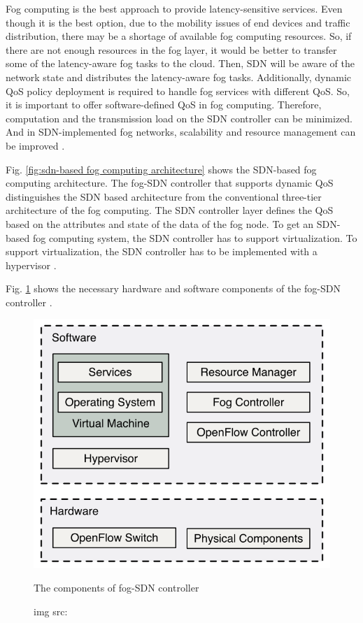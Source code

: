 Fog computing is the best approach to provide latency-sensitive services. Even though it is the best option, due to the mobility issues of end devices and traffic distribution, there may be a shortage of available fog computing resources. So, if there are not enough resources in the fog layer, it would be better to transfer some of the latency-aware fog tasks to the cloud. Then, SDN will be aware of the network state and distributes the latency-aware fog tasks. Additionally, dynamic QoS policy deployment is required to handle fog services with different QoS. So, it is important to offer software-defined QoS in fog computing. Therefore, computation and the transmission load on the SDN controller can be minimized. And in SDN-implemented fog networks, scalability and resource management can be improved \cite{mukherjee2018survey}.

Fig. \ref{fig:sdn-based fog computing architecture} shows the SDN-based fog computing architecture. The fog-SDN controller that supports dynamic QoS distinguishes the SDN based architecture from the conventional three-tier architecture of the fog computing. The SDN controller layer defines the QoS based on the attributes and state of the data of the fog node. To get an SDN-based fog computing system, the SDN controller has to support virtualization. To support virtualization, the SDN controller has to be implemented with a hypervisor \cite{mukherjee2018survey}. \par

Fig. \ref{fig:the components of fog-SDN controller} shows the necessary hardware and software components of the fog-SDN controller \cite{mukherjee2018survey}. \par

\begin{figure}[H]
    \centering
    \includegraphics[width=.5\linewidth]{image/The components of fog-SDN controller.png}
    \caption{The components of fog-SDN controller}
    \caption*{img src: \cite{mukherjee2018survey}}
    \label{fig:the components of fog-SDN controller}
\end{figure}

